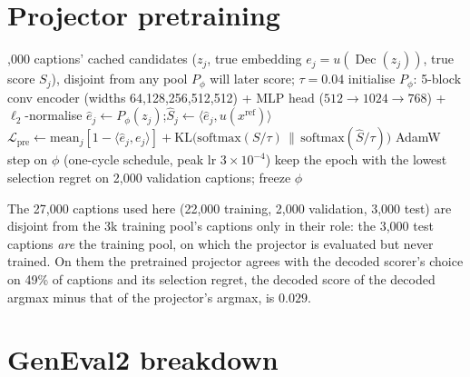 \documentclass{article} %
\DeclareMathOperator{\Dec}{Dec}
\newcommand{\fitbox}[1]{\resizebox{\ifdim\width>\linewidth\linewidth\else\width\fi}{!}{#1}}
\begin{document}
\appendix
\section{Projector pretraining}
\label{app:proj}
\begin{algorithm}[h]
\caption{Pretrain the projector $P_\phi$ (once, before any student training)}
\label{alg:projpretrain}
\begin{algorithmic}[1]
,000 captions' cached candidates ($z_j$, true embedding $e_j=u(\Dec(z_j))$, true score $S_j$), disjoint from any pool $P_\phi$ will later score; $\tau{=}0.04$
\State initialise $P_\phi$: 5-block conv encoder (widths 64,128,256,512,512) + MLP head ($512{\to}1024{\to}768$) + $\ell_2$-normalise
  \State $\hat e_j\gets P_\phi(z_j)$;\quad $\hat S_j\gets\langle\hat e_j,u(x^{\mathrm{ref}})\rangle$
  \State $\mathcal L_{\mathrm{pre}}\gets\mathrm{mean}_j[1-\langle\hat e_j,e_j\rangle]+\mathrm{KL}\big(\mathrm{softmax}(S/\tau)\,\|\,\mathrm{softmax}(\hat S/\tau)\big)$ 
  \State AdamW step on $\phi$ (one-cycle schedule, peak lr $3{\times}10^{-4}$)
\EndFor
\State keep the epoch with the lowest selection regret on 2,000 validation captions; freeze $\phi$
\end{algorithmic}
\end{algorithm}
The 27,000 captions used here (22,000 training, 2,000 validation, 3,000 test) are disjoint from the 3k
training pool's captions only in their role: the 3,000 test captions \emph{are} the training pool, on
which the projector is evaluated but never trained. On them the pretrained projector agrees with the
decoded scorer's choice on 49\% of captions and its selection regret, the decoded score of the decoded
argmax minus that of the projector's argmax, is $0.029$.

\section{GenEval2 breakdown}
\label{app:geneval}
\begin{table}[h]
\centering
\caption{GenEval2 by skill and by prompt complexity, 3k pool, seeds 0--2, averaged checkpoints. Overall
is the official score (each prompt's geometric mean over its atoms, averaged over prompts); collapsed is
the share of prompts with a geometric mean below $0.05$, i.e.\ at least one atom entirely wrong. Skill
rows are the mean score of the atoms tagged with that skill; atom-count rows are the mean score of the
atoms of prompts with that many atoms (100 prompts per count).}
\label{tab:geneval}
\fitbox{}
\end{table}
\end{document}
